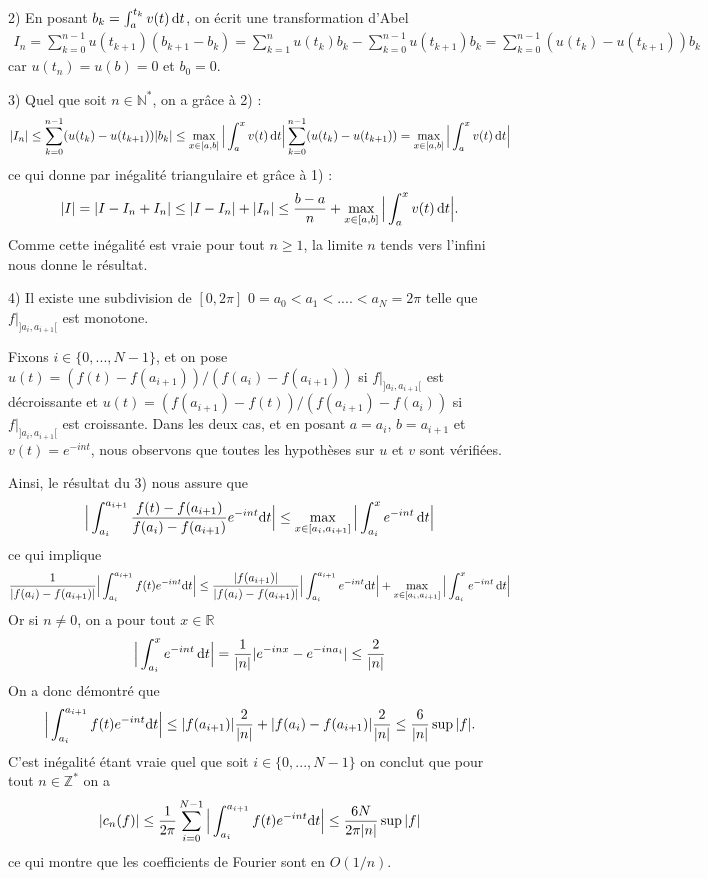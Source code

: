 \documentclass[12pt,a4paper]{article}
\newcommand{\N}{\mathbb{N}}
\newcommand{\R}{\mathbb{R}}
\newcommand{\Z}{\mathbb{Z}}
\begin{document}
2) En posant $b_{k}=\int_{a}^{t_{k}}v(t)\,{\rm d}t$, on \'ecrit une transformation d'Abel
\begin{align*}
I_{n} = \sum_{k=0}^{n-1}u(t_{k+1}) (b_{k+1}-b_{k})= \sum_{k=1}^{n}u(t_{k}) b_{k}-\sum_{k=0}^{n-1}u(t_{k+1}) b_{k} = \sum_{k=0}^{n-1}(u(t_k)-u(t_{k+1}))b_{k}
\end{align*}
car $u(t_{n})=u(b)=0$ et $b_{0}=0$.

3) Quel que soit $n\in \N^*$, on a gr\^ace \`a 2) :
\begin{align*}
|I_{n} | \leq  \sum_{k=0}^{n-1}(u(t_k)-u(t_{k+1}))  | b_{k} |\leq\max_{x\in[a,b]}\Big|\int_a^xv(t)\,{\rm d}t\Big|  \sum_{k=0}^{n-1}(u(t_k)-u(t_{k+1})) = \max_{x\in[a,b]}\Big|\int_a^xv(t)\,{\rm d}t\Big|
\end{align*}
ce qui donne par in\'egalit\'e triangulaire et gr\^ace \`a 1) :
\begin{align*}
|I|=|I-I_{n}+I_{n}|\leq | I- I_{n} | + |I_{n}|\leq \frac{b-a}n +\max_{x\in[a,b]}\Big|\int_a^xv(t)\,{\rm d}t\Big|.
\end{align*}
Comme cette in\'egalit\'e est vraie pour tout $n\geq 1$, la limite $n$ tends vers l'infini nous donne le r\'esultat.

4) Il existe une subdivision de $[0,2\pi]$ $0=a_{0}<a_{1}<....<a_{N}=2\pi$ telle que $f\big|_{]a_{i},a_{i+1}[}$ est monotone.

 Fixons $i\in\{0,...,N-1\}$, et on pose $u(t)=(f(t)-f(a_{i+1}))/(f(a_{i})-f(a_{i+1}))$ si $f\big|_{]a_{i},a_{i+1}[}$ est d\'ecroissante et $u(t)=(f(a_{i+1})-f(t))/(f(a_{i+1})-f(a_{i}))$ si $f\big|_{]a_{i},a_{i+1}[}$ est croissante. Dans les deux cas, et en posant $a=a_{i}$, $b=a_{i+1}$ et $v(t)=e^{-int}$, nous observons que toutes les hypoth\`eses sur $u$ et $v$ sont v\'erifi\'ees.
 
 Ainsi, le r\'esultat du 3) nous assure que
 \[
\Big| \int_{a_{i}}^{a_{i+1}} \frac{f(t)-f(a_{i+1})}{f(a_{i})-f(a_{i+1})} e^{-int} {\rm d}t\Big| \leq \max_{x\in[a_{i},a_{i+1}]}\Big|\int_{a_{i}}^x e^{-int}\,{\rm d}t\Big|
 \]
 ce qui implique
\begin{align*}
\frac1{|f(a_{i})-f(a_{i+1})|} \Big| \int_{a_{i}}^{a_{i+1}} f(t) e^{-int} {\rm d}t\Big| \leq \frac{|f(a_{i+1})|}{|f(a_{i})-f(a_{i+1})|} \Big| \int_{a_{i}}^{a_{i+1}}  e^{-int} {\rm d}t\Big|+  \max_{x\in[a_{i},a_{i+1}]}\Big|\int_{a_{i}}^x e^{-int}\,{\rm d}t\Big| 
\end{align*}
Or si $n\neq 0$, on a pour tout $x \in \R$
$$\Big|\int_{a_{i}}^x e^{-int}\,{\rm d}t\Big| = \frac1{|n|} |e^{-inx}- e^{-ina_{i}}|\leq \frac2{|n|}$$
On a donc d\'emontr\'e que
\[
\Big| \int_{a_{i}}^{a_{i+1}} f(t) e^{-int} {\rm d}t\Big|  \leq |f(a_{i+1})| \frac2{|n|} + |f(a_{i})-f(a_{i+1})|\frac2{|n|} \leq \frac{6}{|n|} \sup |f|.
\]
C'est in\'egalit\'e \'etant vraie quel que soit $i\in\{0,...,N-1\}$ on conclut que pour tout $n\in  \Z^*$ on a
\[
|c_{n}(f)| \leq \frac1{2\pi} \sum_{i=0}^{N-1}\Big| \int_{a_{i}}^{a_{i+1}} f(t) e^{-int} {\rm d}t\Big| \leq \frac{6N}{2\pi |n|} \sup |f|
\]
ce qui montre que les coefficients de Fourier sont en $O(1/n)$.
\end{document}
